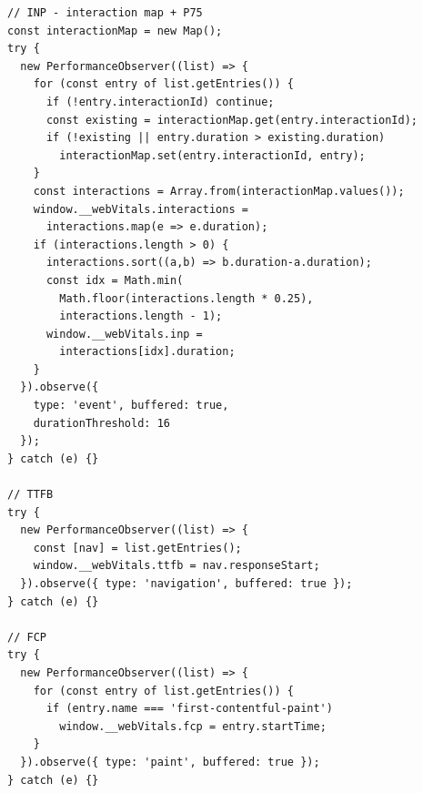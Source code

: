 \begin{lstlisting}
// INP - interaction map + P75
const interactionMap = new Map();
try {
  new PerformanceObserver((list) => {
    for (const entry of list.getEntries()) {
      if (!entry.interactionId) continue;
      const existing = interactionMap.get(entry.interactionId);
      if (!existing || entry.duration > existing.duration)
        interactionMap.set(entry.interactionId, entry);
    }
    const interactions = Array.from(interactionMap.values());
    window.__webVitals.interactions =
      interactions.map(e => e.duration);
    if (interactions.length > 0) {
      interactions.sort((a,b) => b.duration-a.duration);
      const idx = Math.min(
        Math.floor(interactions.length * 0.25),
        interactions.length - 1);
      window.__webVitals.inp =
        interactions[idx].duration;
    }
  }).observe({
    type: 'event', buffered: true,
    durationThreshold: 16
  });
} catch (e) {}

// TTFB
try {
  new PerformanceObserver((list) => {
    const [nav] = list.getEntries();
    window.__webVitals.ttfb = nav.responseStart;
  }).observe({ type: 'navigation', buffered: true });
} catch (e) {}

// FCP
try {
  new PerformanceObserver((list) => {
    for (const entry of list.getEntries()) {
      if (entry.name === 'first-contentful-paint')
        window.__webVitals.fcp = entry.startTime;
    }
  }).observe({ type: 'paint', buffered: true });
} catch (e) {}
\end{lstlisting}




